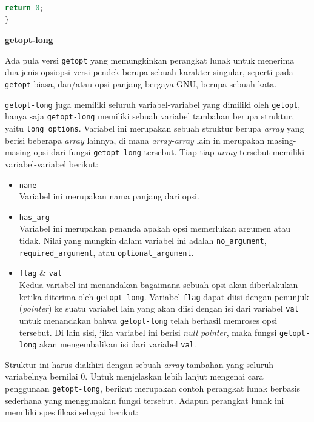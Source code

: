 \documentclass[a4paper,twoside]{article}
\begin{document}
\begin{enumerate}
\begin{lstlisting}[language=C, caption=Contoh sederhana penggunaan getopt, label=code:getopt-usage]
    return 0;
}
\end{lstlisting}

\textbf{getopt-long}
\label{sec:cmodules-getopt-long}

Ada pula versi \verb|getopt| yang memungkinkan perangkat lunak untuk menerima dua jenis opsi\textemdash opsi versi pendek berupa sebuah karakter singular, seperti pada \verb|getopt| biasa, dan/atau opsi panjang bergaya GNU, berupa sebuah kata.

\verb|getopt-long| juga memiliki seluruh variabel-variabel yang dimiliki oleh \verb|getopt|, hanya saja \verb|getopt-long| memiliki sebuah variabel tambahan berupa struktur, yaitu \verb|long_options|. Variabel ini merupakan sebuah struktur berupa \textit{array} yang berisi beberapa \textit{array} lainnya, di mana \textit{array-array} lain in merupakan masing-masing opsi dari fungsi \verb|getopt-long| tersebut. Tiap-tiap \textit{array} tersebut memiliki variabel-variabel berikut:

\begin{itemize}
	\item \verb|name|\\
	Variabel ini merupakan nama panjang dari opsi.
	\item \verb|has_arg|\\
	Variabel ini merupakan penanda apakah opsi memerlukan argumen atau tidak. Nilai yang mungkin dalam variabel ini adalah \verb|no_argument|, \verb|required_argument|, atau \verb|optional_argument|.
	\item \verb|flag| \& \verb|val|\\ 
	Kedua variabel ini menandakan bagaimana sebuah opsi akan diberlakukan ketika diterima oleh \verb|getopt-long|. Variabel \verb|flag| dapat diisi dengan penunjuk (\textit{pointer}) ke suatu variabel lain yang akan diisi dengan isi dari variabel \verb|val| untuk menandakan bahwa \verb|getopt-long| telah berhasil memroses opsi tersebut. Di lain sisi, jika variabel ini berisi \textit{null pointer}, maka fungsi \verb|getopt-long| akan mengembalikan isi dari variabel \verb|val|.
\end{itemize}
\noindent
Struktur ini harus diakhiri dengan sebuah \textit{array} tambahan yang seluruh variabelnya bernilai 0.
\newline\newline
Untuk menjelaskan lebih lanjut mengenai cara penggunaan \verb|getopt-long|, berikut merupakan contoh perangkat lunak berbasis \cl sederhana yang menggunakan fungsi tersebut. Adapun perangkat lunak ini memiliki spesifikasi sebagai berikut:


\end{enumerate}
\end{document}
